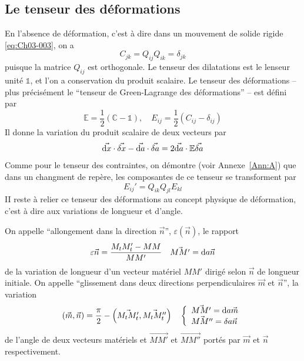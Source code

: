 \subsection{Le tenseur des déformations} \label{ssec:Ch03-1.2}
En l'absence de déformation, c'est à dire dans un mouvement de solide rigide \eqref{eq:Ch03-003}, on a
\begin{equation}
    C_{jk} = Q_{ij} Q_{ik} = \delta_{jk}
    \label{eq:Ch03-009}
\end{equation}
puisque la matrice $Q_{ij}$ est orthogonale.
Le tenseur des dilatations est le lenseur unité $\mathbb{1}$, et l'on a conservation du produit scalaire.
Le tenseur des déformations -- plus précisément le ``tenseur de Green-Lagrange des déformations'' -- est défini par
\begin{equation}
    \mathbb{E} = \frac{1}{2} \left( \mathbb{C} - \mathbb{1} \right), \quad E_{ij} = \frac{1}{2} \left( C_{ij} - \delta_{ij} \right)
    \label{eq:Ch03-010}
\end{equation}
Il donne la variation du produit scalaire de deux vecteurs par
\begin{equation}
    \vec{\mathrm{d} x} \cdot \vec{\delta x} - \vec{\mathrm{d} a} \cdot \vec{\delta a} = 2 \vec{\mathrm{d} a} \cdot \mathbb{E} \vec{\delta a}
    \label{eq:Ch03-011}
\end{equation}
Comme pour le tenseur des contraintes, on démontre (voir Annexe~\ref{Ann:A}) que  dans  un  changment de repère, les composantes de  ce tenseur se transforment par
\begin{equation}
    E_{ij}' = Q_{ik} Q_{jl} E_{kl}
    \label{eq:Ch03-012}
\end{equation}
II reste à relier ce tenseur des déformations au concept physique de déformation, c'est à dire aux variations de longueur et d'angle.
\begin{defn}
    On appelle ``allongement dans la direction $\vec{n}$'', $\varepsilon \left( \vec{n} \right)$, le rapport
    \begin{equation}
        \varepsilon \vec{n} = \frac{M_tM_t' -MM}{MM'} \quad \vec{MM'} = \mathrm{d} a \vec{n}
        \label{eq:Ch03-013}
    \end{equation}
    de la variation de longueur d'un vecteur matériel $MM'$ dirigé selon $\vec{n}$ de longueur initiale.
    On appelle ``glissement dans deux directions perpendiculaires $\vec{m}$ et $\vec{n}$'', la variation
    \begin{equation}
        \left( \vec{m}, \vec{n} \right) = \frac{\pi}{2} - \left( \vec{M_t M_t'}, \vec{M_tM_t''} \right) 
        \quad \left\{
        \begin{array}{l}
            \vec{MM'} = \mathrm{d} a \vec{m} \\
            \vec{MM''} = \delta a \vec{n}
        \end{array}
        \right.
        \label{eq:Ch03-014}
    \end{equation}
    de l'angle de deux vecteurs matériels et $\vec{MM'}$ et $\vec{MM''}$ port\'es par $\vec{m}$ et $\vec{n}$ respectivement.
\end{defn}
